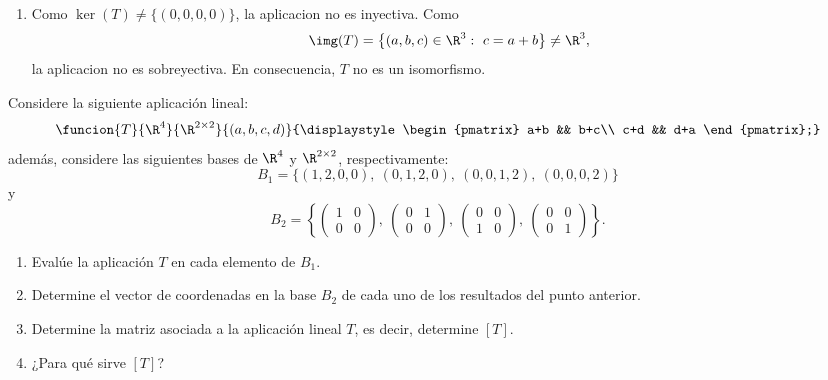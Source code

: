 \documentclass[11pt,respuestas,a4]{aleph-examen}
\begin{document}
\begin{preguntas}
\begin{respuesta}
\begin{enumerate}
\[\begin{pmatrix}
            0 & 1 & 1 & | & b\\
            0 & 0 & 0 & | & c-a-b
        \end{pmatrix}.
    \]
    Entonces, el sistema tiene solucion si y solo si $c=a+b$. Por lo tanto,
    \[
        \img(T)=\big\{(a,b,c)\in\R^3:\ c=a+b\big\}.
    \]
    Además, como
    \[
        (a,b,c) = (a,b,a+b) = a(1,0,1)+b(0,1,1),
    \]
    se tiene que
    \[
        \img(T)=
        \gen\big\{(1,0,1),(0,1,1)\big\}.
    \]
    Así, una base para la imagen es
    \[
        \big\{(1,0,1),(0,1,1)\big\}.
    \]
\item
    Como $\ker(T)\neq\{(0,0,0,0)\}$, la aplicacion no es inyectiva. Como
    \[
        \img(T)=\big\{(a,b,c)\in\R^3:\ c=a+b\big\}\neq\R^3,
    \]
    la aplicacion no es sobreyectiva. En consecuencia, $T$ no es un isomorfismo.\qedhere
\end{enumerate}
\end{respuesta}

\item
    Considere la siguiente aplicación lineal:
    \[
        \funcion{T}{\R^4}{\R^{2\times 2}}
            {(a,b,c,d)}{\displaystyle\begin{pmatrix} a+b && b+c\\ c+d && d+a \end{pmatrix};}
    \]
    además, considere las siguientes bases de $\R^4$ y $\R^{2\times 2}$, respectivamente:
    \[
        B_1=\{ (1,2,0,0),\ (0,1,2,0),\ (0,0,1,2),\ (0,0,0,2)\}
    \]
    y
    \[
        B_2=\left\{
            \begin{pmatrix} 1 & 0 \\ 0 & 0 \end{pmatrix},\ 
            \begin{pmatrix} 0 & 1 \\ 0 & 0 \end{pmatrix},\ 
            \begin{pmatrix} 0 & 0 \\ 1 & 0 \end{pmatrix},\ 
            \begin{pmatrix} 0 & 0 \\ 0 & 1 \end{pmatrix}
        \right\}.
    \]
    \begin{enumerate}
    \item
        Evalúe la aplicación $T$ en cada elemento de $B_1$. 
    \item
        Determine el vector de coordenadas en la base $B_2$ de cada uno de los resultados del punto anterior. 
    \item
        Determine la matriz asociada a la aplicación lineal $T$, es decir, determine $[T]$. 
    \item
        ¿Para qué sirve $[T]$? 
    \end{enumerate}


\end{preguntas}
\end{document}
